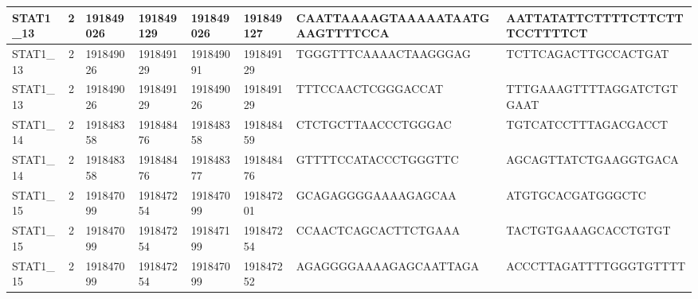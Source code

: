 \begin{landscape}
\begin{longtable}{| p{} | p{} | p{} | p{} | p{} | p{} | p{} | p{} |}
\multicolumn{1}{|l|}{STAT1\_13}  & \multicolumn{1}{c|}{2}  & \multicolumn{1}{l|}{191849026} & \multicolumn{1}{l|}{191849129} & \multicolumn{1}{l|}{191849026} & \multicolumn{1}{l|}{191849127} & \multicolumn{1}{l|}{CAATTAAAAGTAAAAATAATGAAGTTTTCCA} & \multicolumn{1}{l|}{AATTATATTCTTTTCTTCTTTCCTTTTCT} \\ \hline
\multicolumn{1}{|l|}{STAT1\_13}  & \multicolumn{1}{c|}{2}  & \multicolumn{1}{l|}{191849026} & \multicolumn{1}{l|}{191849129} & \multicolumn{1}{l|}{191849091} & \multicolumn{1}{l|}{191849129} & \multicolumn{1}{l|}{TGGGTTTCAAAACTAAGGGAG}           & \multicolumn{1}{l|}{TCTTCAGACTTGCCACTGAT}          \\ \hline
\multicolumn{1}{|l|}{STAT1\_13}  & \multicolumn{1}{c|}{2}  & \multicolumn{1}{l|}{191849026} & \multicolumn{1}{l|}{191849129} & \multicolumn{1}{l|}{191849026} & \multicolumn{1}{l|}{191849129} & \multicolumn{1}{l|}{TTTCCAACTCGGGACCAT}              & \multicolumn{1}{l|}{TTTGAAAGTTTTAGGATCTGTGAAT}     \\ \hline
\multicolumn{1}{|l|}{STAT1\_14}  & \multicolumn{1}{c|}{2}  & \multicolumn{1}{l|}{191848358} & \multicolumn{1}{l|}{191848476} & \multicolumn{1}{l|}{191848358} & \multicolumn{1}{l|}{191848459} & \multicolumn{1}{l|}{CTCTGCTTAACCCTGGGAC}             & \multicolumn{1}{l|}{TGTCATCCTTTAGACGACCT}          \\ \hline
\multicolumn{1}{|l|}{STAT1\_14}  & \multicolumn{1}{c|}{2}  & \multicolumn{1}{l|}{191848358} & \multicolumn{1}{l|}{191848476} & \multicolumn{1}{l|}{191848377} & \multicolumn{1}{l|}{191848476} & \multicolumn{1}{l|}{GTTTTCCATACCCTGGGTTC}            & \multicolumn{1}{l|}{AGCAGTTATCTGAAGGTGACA}         \\ \hline
\multicolumn{1}{|l|}{STAT1\_15}  & \multicolumn{1}{c|}{2}  & \multicolumn{1}{l|}{191847099} & \multicolumn{1}{l|}{191847254} & \multicolumn{1}{l|}{191847099} & \multicolumn{1}{l|}{191847201} & \multicolumn{1}{l|}{GCAGAGGGGAAAAGAGCAA}             & \multicolumn{1}{l|}{ATGTGCACGATGGGCTC}             \\ \hline
\multicolumn{1}{|l|}{STAT1\_15}  & \multicolumn{1}{c|}{2}  & \multicolumn{1}{l|}{191847099} & \multicolumn{1}{l|}{191847254} & \multicolumn{1}{l|}{191847199} & \multicolumn{1}{l|}{191847254} & \multicolumn{1}{l|}{CCAACTCAGCACTTCTGAAA}            & \multicolumn{1}{l|}{TACTGTGAAAGCACCTGTGT}          \\ \hline
\multicolumn{1}{|l|}{STAT1\_15}  & \multicolumn{1}{c|}{2}  & \multicolumn{1}{l|}{191847099} & \multicolumn{1}{l|}{191847254} & \multicolumn{1}{l|}{191847099} & \multicolumn{1}{l|}{191847252} & \multicolumn{1}{l|}{AGAGGGGAAAAGAGCAATTAGA}          & \multicolumn{1}{l|}{ACCCTTAGATTTTGGGTGTTTT}        \\ \hline

\end{longtable}
\end{landscape}
